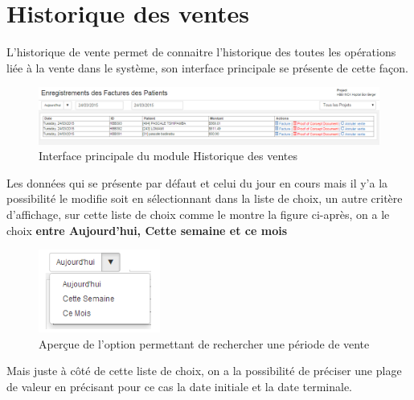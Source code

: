 \documentclass[12pt,a4paper]{report}
\begin{document}
\newpage

\section{Historique des ventes}
L'historique de vente permet de connaitre l'historique des toutes les opérations liée à la vente dans le système, son interface principale se présente de cette façon.


\begin{figure}[h]
\begin{center}
\includegraphics[width=14cm]{pic/HistoVente.png}
\end{center}
\caption{Interface principale du module Historique des ventes}
\label{Interface principale du module Historique des ventes}
\end{figure}

Les données qui se présente par défaut et celui du jour en cours mais il y'a la possibilité le modifie soit en sélectionnant dans la liste de choix, un autre critère d'affichage, sur cette liste de choix comme le montre la figure ci-après, on a le choix \textbf{entre Aujourd'hui, Cette semaine et ce mois} 


\begin{figure}[h]
\begin{center}
\includegraphics[width=4cm]{pic/SelectJour.png}
\end{center}
\caption{Aperçue de l'option permettant de rechercher une période de vente}
\label{Aperçue de l'option permettant de rechercher une période de vente}
\end{figure}

Mais juste à côté de cette liste de choix, on a la possibilité de préciser une plage de valeur en précisant pour ce cas la date initiale et la date terminale.
\end{document}
